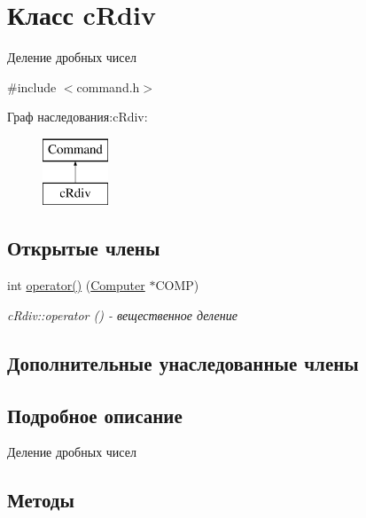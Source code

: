 \hypertarget{classc_rdiv}{}\section{Класс c\+Rdiv}
\label{classc_rdiv}


Деление дробных чисел  




{\ttfamily \#include $<$command.\+h$>$}

Граф наследования\+:c\+Rdiv\+:\begin{figure}[H]
\begin{center}
\leavevmode
\includegraphics[height=2.000000cm]{classc_rdiv}
\end{center}
\end{figure}
\subsection*{Открытые члены}
\begin{DoxyCompactItemize}
\item 
int \hyperlink{classc_rdiv_a2ce07afa960d74895bcfc2028220e51b}{operator()} (\hyperlink{class_computer}{Computer} $\ast$C\+O\+MP)
\begin{DoxyCompactList}\small\item\em c\+Rdiv\+::operator () -\/ вещественное деление \end{DoxyCompactList}\end{DoxyCompactItemize}
\subsection*{Дополнительные унаследованные члены}


\subsection{Подробное описание}
Деление дробных чисел 

\subsection{Методы}
\hypertarget{classc_rdiv_a2ce07afa960d74895bcfc2028220e51b}{}\label{classc_rdiv_a2ce07afa960d74895bcfc2028220e51b} 
